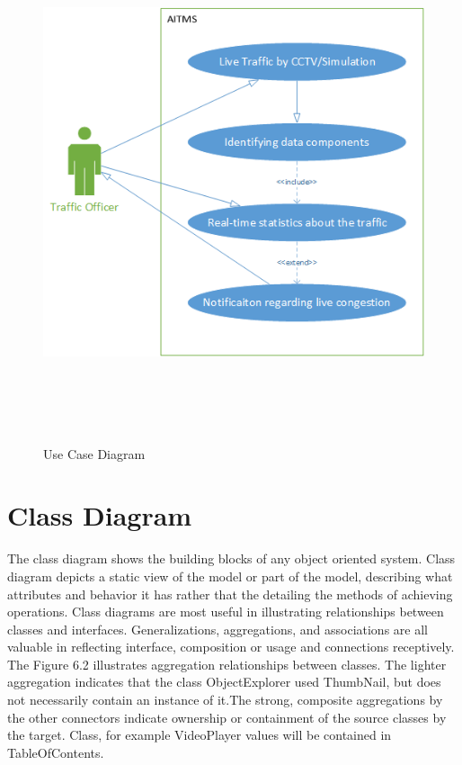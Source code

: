 \documentclass[openany,12pt]{report}
\begin{document}
\begin{figure}[H]
\centering
\includegraphics[height=6in]{./diagrams/png/uml}
\caption{Use Case Diagram}
\end{figure}

\newpage
\section{Class Diagram}
\hspace*{0.5in}The class diagram shows the building blocks of any object oriented system. Class diagram depicts a static view of the model or part of the model, describing what attributes and behavior it has rather that the detailing the methods of achieving operations. Class diagrams are most useful in illustrating relationships between classes and interfaces. Generalizations, aggregations, and associations are all valuable in reflecting interface, composition or usage and connections receptively.\\
\hspace*{0.5in}The Figure 6.2 illustrates aggregation relationships between classes. The lighter aggregation indicates that the class ObjectExplorer used ThumbNail, but does not necessarily contain an instance of it.The strong, composite aggregations by the other connectors indicate ownership or containment of the source classes by the target. Class, for example VideoPlayer  values will be contained in TableOfContents.
\end{document}
